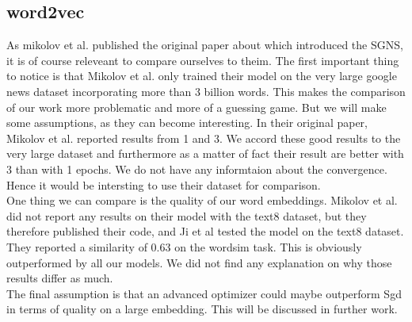 \subsection{word2vec}

As mikolov et al. published the original paper about which introduced the SGNS, it is of course releveant to compare ourselves to theim. The first important thing to notice is that Mikolov et al. only trained their model on the very large google news dataset incorporating more than 3 billion words. This makes the comparison of our work more problematic and more of a guessing game. But we will make some assumptions, as they can become interesting. 
In their original paper, Mikolov et al. reported results from 1 and 3. We accord these good results to the very large dataset  and furthermore as a matter of fact their result are better with 3 than with 1 epochs. We do not have any informtaion about the convergence. Hence it would be intersting to use their dataset for comparison. \\
One thing we can compare is the quality of our word embeddings. Mikolov et al. did not report any results on their model with the text8 dataset, but they therefore published their code, and Ji et al \cite{intel} tested the model on the text8 dataset. They reported a similarity of 0.63 on the wordsim task. This is obviously outperformed by all our models. We did not find any explanation on why those results differ as much. \\
The final assumption is that an advanced optimizer could maybe outperform Sgd in terms of quality on a large embedding. This will be discussed in further work.
 


